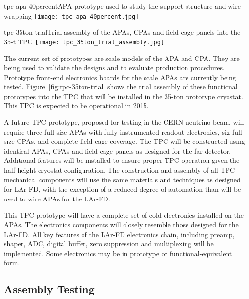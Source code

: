 \begin{cdrfigure}{tpc-apa-40percent}{APA prototype used to study the support structure and wire wrapping}
\texttt{[image: tpc\_apa\_40percent.jpg]}
\end{cdrfigure}

\begin{cdrfigure}{tpc-35ton-trial}{Trial assembly of the APAs, CPAs and field cage panels into the 35-t TPC}
\texttt{[image: tpc\_35ton\_trial\_assembly.jpg]}
\end{cdrfigure}

The %
current set of prototypes are scale models of the APA and CPA. They are being used to validate the designs and to evaluate production procedures. Prototype front-end electronics boards for the scale APAs are currently being tested. Figure~\ref{fig:tpc-35ton-trial} shows the trial assembly of these functional prototypes into the TPC that will be installed in the 35-ton prototype cryostat. This TPC is expected to be operational in 2015.

A future TPC prototype, proposed for testing in the CERN neutrino beam, will require three full-size APAs with fully instrumented readout electronics, six full-size CPAs, and complete field-cage coverage. The TPC will be constructed using identical APAs, CPAs and field-cage panels as designed for the far detector. Additional features will be installed to ensure proper TPC operation given the half-height cryostat configuration. The construction and assembly of all TPC mechanical components will use the same materials and techniques as designed for LAr-FD, with the exception of a reduced degree of automation than will be used to wire APAs for the LAr-FD. 

This TPC prototype will have a complete set of cold electronics installed on the APAs. The electronics components will closely resemble those designed for the LAr-FD. All key features of the LAr-FD electronics chain, including preamp, shaper, ADC, digital buffer, zero suppression and multiplexing will be implemented. Some electronics may be in prototype or functional-equivalent form.


\subsection{Assembly Testing}
\label{sec:v5-tpc-checkout-test}

